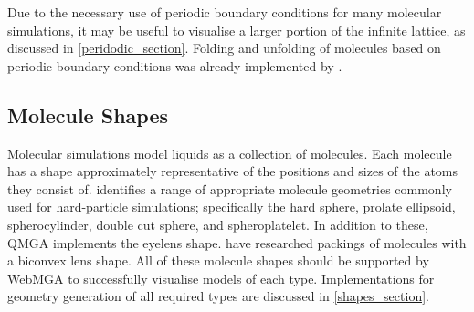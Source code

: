 Due to the necessary use of periodic boundary conditions for many molecular simulations, it may be useful to visualise a larger portion of the infinite lattice, as discussed in \cref{peridodic_section}. Folding and unfolding of molecules based on periodic boundary conditions was already implemented by \textcite{webmga_2}.

\subsection{Molecule Shapes}
Molecular simulations model liquids as a collection of molecules. Each molecule has a shape approximately representative of the positions and sizes of the atoms they consist of. \textcite{allen2019molecular} identifies a range of appropriate molecule geometries commonly used for hard-particle simulations; specifically the hard sphere, prolate ellipsoid, spherocylinder, double cut sphere, and spheroplatelet. In addition to these, QMGA implements the eyelens shape. \textcite{cinacchi2019hard} have researched packings of molecules with a biconvex lens shape. All of these molecule shapes should be supported by WebMGA to successfully visualise models of each type. Implementations for geometry generation of all required types are discussed in \cref{shapes_section}.
